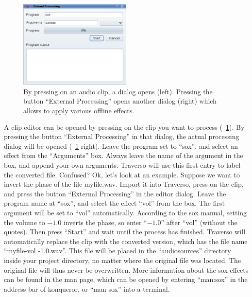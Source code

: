 \begin{figure}
	\centering
	\includegraphics[width=0.5\textwidth]{images/external00}
	\caption{By pressing  on an audio clip, a dialog opens (left). Pressing the button ``External Processing'' opens another dialog (right) which allows to apply various offline effects.}
	\label{fig_external01}
\end{figure}

A clip editor can be opened by pressing  on the clip you want to process (\FigB~\ref{fig_external01}). By pressing the button ``External Processing'' in that dialog, the actual processing dialog will be opened (\FigB~\ref{fig_external01} right). Leave the program set to ``sox'', and select an effect from the ``Arguments'' box. Always leave the name of the argument in the box, and append your own arguments. Traverso will use this first entry to label the converted file. Confused? Ok, let's look at an example. Suppose we want to invert the phase of the file myfile.wav. Import it into Traverso, press  on the clip, and press the button ``External Processing'' in the editor dialog. Leave the program name at ``sox'', and select the effect ``vol'' from the box. The first argument will be set to ``vol'' automatically. According to the sox manual, setting the volume to $-1.0$ inverts the phase, so enter ``$-1.0$'' after ``vol'' (without the quotes). Then press ``Start'' and wait until the process has finished. Traverso will automatically replace the clip with the converted version, which has the file name ``myfile-vol -1.0.wav''. This file will be placed in the ``audiosources'' directory inside your project directory, no matter where the original file was located. The original file will thus never be overwritten. More information about the sox effects can be found in the man page, which can be opened by entering ``man:sox'' in the address bar of konqueror, or ``man sox'' into a terminal.
